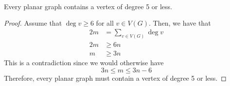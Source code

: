 \begin{corollary}
  Every planar graph contains a vertex of degree 5 or less.
\end{corollary}

\begin{proof}
  Assume that \(\deg v \geq 6\) for all \(v \in V(G)\). Then, we
  have that
 \[
    \begin{aligned}
      2m &= \sum_{v \in V(G)} \deg v \\
      2m &\geq 6n \\
      m &\geq 3n
    \end{aligned}
  \]
  This is a contradiction since we would otherwise have
  \[ 3n \leq m \leq 3n - 6 \]
  Therefore, every planar graph must contain a vertex of degree
  5 or less.
\end{proof}

